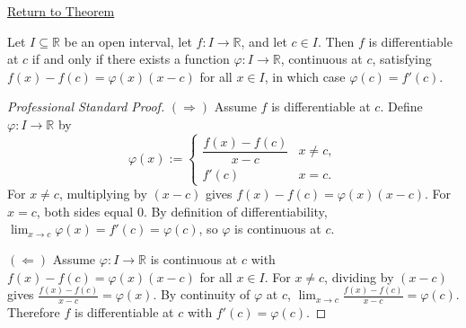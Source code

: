 \newpage
{}
\label{prf:caratheodory-theorem}

\begin{remark*}[Return]
\hyperref[thm:caratheodory]{Return to Theorem}
\end{remark*}

\begin{theorem*}
Let $I \subseteq \mathbb{R}$ be an open interval, let $f : I \to \mathbb{R}$, and let $c \in I$. Then $f$ is differentiable at $c$ if and only if there exists a function $\varphi : I \to \mathbb{R}$, continuous at $c$, satisfying $f(x) - f(c) = \varphi(x)(x - c)$ for all $x \in I$, in which case $\varphi(c) = f'(c)$.
\end{theorem*}

\begin{proof}[Professional Standard Proof]
\LRAProofBodyStart
$(\Rightarrow)$ Assume $f$ is differentiable at $c$. Define $\varphi : I \to \mathbb{R}$ by
\[
  \varphi(x) :=
  \begin{cases}
    \dfrac{f(x) - f(c)}{x - c} & x \neq c, \\[6pt]
    f'(c)                       & x = c.
  \end{cases}
\]
For $x \neq c$, multiplying by $(x-c)$ gives $f(x) - f(c) = \varphi(x)(x-c)$. For $x = c$, both sides equal $0$. By definition of differentiability, $\lim_{x \to c} \varphi(x) = f'(c) = \varphi(c)$, so $\varphi$ is continuous at $c$.

$(\Leftarrow)$ Assume $\varphi : I \to \mathbb{R}$ is continuous at $c$ with $f(x) - f(c) = \varphi(x)(x-c)$ for all $x \in I$. For $x \neq c$, dividing by $(x-c)$ gives $\frac{f(x) - f(c)}{x - c} = \varphi(x)$. By continuity of $\varphi$ at $c$, $\lim_{x \to c} \frac{f(x) - f(c)}{x - c} = \varphi(c)$. Therefore $f$ is differentiable at $c$ with $f'(c) = \varphi(c)$.
\end{proof}


